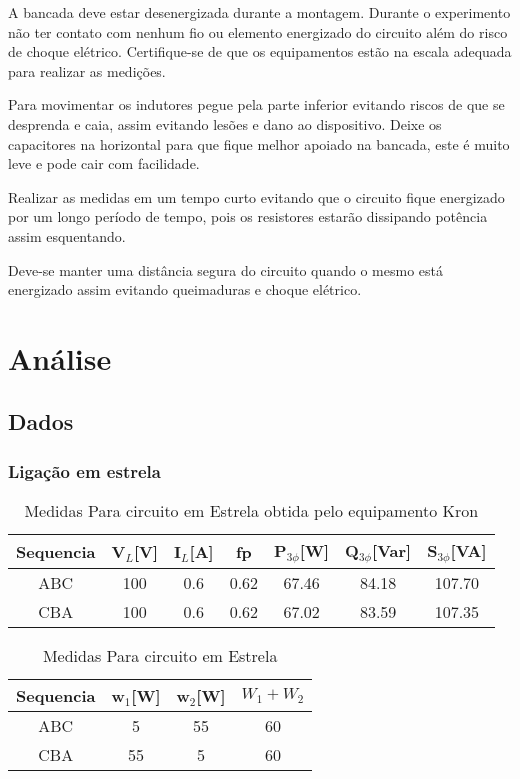 \documentclass[a4paper, 12pt]{article}
\begin{document}
    A bancada deve estar desenergizada durante a montagem. Durante o experimento não ter contato com nenhum fio ou elemento energizado do circuito além do risco de choque elétrico. Certifique-se de que os equipamentos estão na escala adequada para realizar as medições.

    Para movimentar os indutores pegue pela parte inferior evitando riscos de que se desprenda e caia, assim evitando lesões e dano ao dispositivo. Deixe os capacitores na horizontal para que
    fique melhor apoiado na bancada, este é muito leve e pode cair com facilidade.

    Realizar as medidas em um tempo curto evitando que o circuito fique energizado por um longo período de tempo, pois os resistores estarão dissipando potência assim esquentando.

   Deve-se manter uma distância segura do circuito quando o mesmo está energizado assim evitando queimaduras e choque elétrico.


\newpage
\section{Análise}
    \justifying
    \subsection{Dados}
        \subsubsection{Ligação em estrela}
        \justifying

    \begin{table}[H]
         \centering
        \begin{tabular}{|c|c|c|c|c|c|c|}
              \hline %
                  Sequencia & V$_L$[V] & I$_L$[A] & fp & P$_{3\phi}$[W] & Q$_{3\phi}$[Var] & S$_{3\phi}$[VA] \\
              \hline %
           ABC & 100 & 0.6 & 0.62 & 67.46 & 84.18 & 107.70     \\
              \hline %
           CBA & 100 & 0.6 & 0.62 & 67.02 & 83.59 & 107.35     \\
              \hline %
        \end{tabular}
        \caption{Medidas Para circuito em Estrela obtida pelo equipamento Kron}
    \end{table}
    \begin{table}[H]
         \centering
        \begin{tabular}{|c|c|c|c|}
              \hline %
                  Sequencia & w$_1$[W] & w$_2$[W] & $W_1 + W_2$ \\
              \hline %
           ABC & 5 & 55 & 60     \\
              \hline %
           CBA & 55 & 5 & 60     \\
              \hline %
        \end{tabular}
        \caption{Medidas Para circuito em Estrela}
    \end{table}
\end{document}
